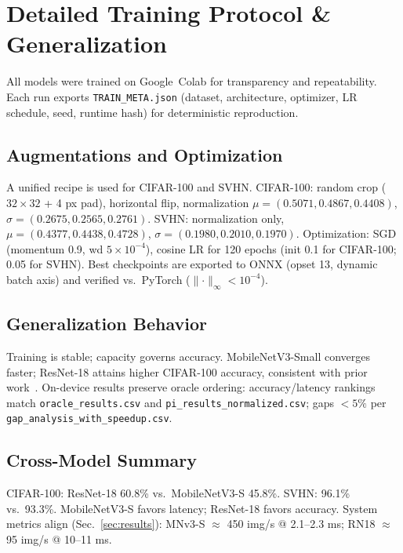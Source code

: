 \documentclass{article}
\begin{document}
\section{Detailed Training Protocol \& Generalization}
\label{sec:train-protocol}

All models were trained on Google~Colab for transparency and repeatability.  
Each run exports \texttt{TRAIN\_META.json} (dataset, architecture, optimizer, LR schedule, seed, runtime hash) for deterministic reproduction.

\subsection{Augmentations and Optimization}
A unified recipe is used for CIFAR-100 and SVHN.  
CIFAR-100: random crop ($32{\times}32$ + 4 px pad), horizontal flip, normalization $\mu{=}(0.5071,0.4867,0.4408)$, $\sigma{=}(0.2675,0.2565,0.2761)$.  
SVHN: normalization only, $\mu{=}(0.4377,0.4438,0.4728)$, $\sigma{=}(0.1980,0.2010,0.1970)$.  
Optimization: SGD (momentum 0.9, wd $5{\times}10^{-4}$), cosine LR for 120 epochs (init 0.1 for CIFAR-100; 0.05 for SVHN).  
Best checkpoints are exported to ONNX (opset 13, dynamic batch axis) and verified vs.\ PyTorch ($\lVert\cdot\rVert_\infty<10^{-4}$).

\subsection{Generalization Behavior}
Training is stable; capacity governs accuracy.  
MobileNetV3-Small converges faster; ResNet-18 attains higher CIFAR-100 accuracy, consistent with prior work~\cite{howard2019mobilenetv3,he2016resnet,krizhevsky2009tiny}.  
On-device results preserve oracle ordering: accuracy/latency rankings match \texttt{oracle\_results.csv} and \texttt{pi\_results\_normalized.csv}; gaps $<5\%$ per \texttt{gap\_analysis\_with\_speedup.csv}.

\subsection{Cross-Model Summary}
CIFAR-100: ResNet-18 60.8\% vs.\ MobileNetV3-S 45.8\%.  
SVHN: 96.1\% vs.\ 93.3\%.  
MobileNetV3-S favors latency; ResNet-18 favors accuracy.  
System metrics align (Sec.~\ref{sec:results}): MNv3-S $\approx$ 450 img/s @ 2.1–2.3 ms; RN18 $\approx$ 95 img/s @ 10–11 ms.
\end{document}
